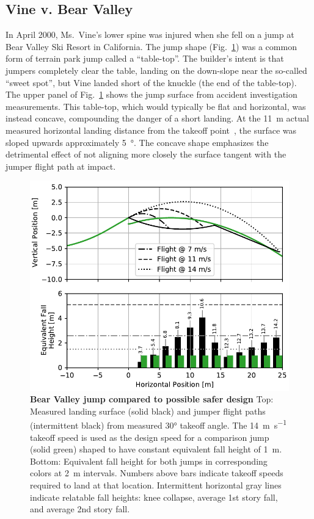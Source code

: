 \documentclass[smallextended]{svjour3}       %
\begin{document}
\subsection{Vine v. Bear Valley}
\label{sec:vine}
%
In April 2000, Ms.~Vine's lower spine was injured when she fell on a jump at
Bear Valley Ski Resort in California. The jump shape (Fig.~\ref{fig:vine-v-bear-valley}) 
was a common form of terrain park jump called a ``table-top''.
The builder's intent is that jumpers completely clear the table, landing on the
down-slope near the so-called ``sweet spot'', but Vine landed short of the
knuckle (the end of the table-top). The upper panel of
Fig.~\ref{fig:vine-v-bear-valley} shows the jump surface from
accident investigation measurements. This table-top, which would typically be
flat and horizontal, was instead concave, compounding the danger of a short
landing. At the 11~\si{\meter} actual measured horizontal landing distance from
the takeoff point~, the surface was sloped
upwards approximately 5~\si{\degree}.  The concave shape emphasizes the
detrimental effect of not aligning more closely the surface tangent with the
jumper flight path at impact.
%
\begin{figure}
  \centering
  \includegraphics[width=5.25in]{figures/vine-v-bear-valley.pdf}
  \caption{\textbf{Bear Valley jump compared to possible safer design}
  Top: Measured landing surface (solid black) and jumper flight paths
  (intermittent black) from measured 30\si{\degree} takeoff angle. The
  14~\si{\meter\per\second} takeoff speed is used as the design speed \cite{Levy2015} for a
  comparison jump (solid green) shaped to have constant equivalent fall
  height of 1~\si{\meter}.
  Bottom: Equivalent fall height for both jumps in corresponding
  colors at 2~\si{\meter} intervals. Numbers above bars indicate
  takeoff speeds required to land at that location.
  Intermittent horizontal gray lines indicate relatable fall heights: knee
  collapse, average 1st story fall, and average 2nd story fall.
  }
  \label{fig:vine-v-bear-valley}
\end{figure}
\end{document}
